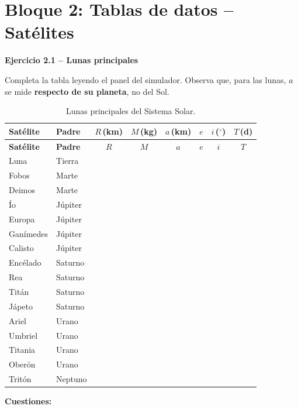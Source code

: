 \documentclass[11pt,a4paper]{article}
\newenvironment{cajaEjercicio}[1][]{\par\medskip\noindent\textbf{#1}\par\smallskip}{\par\medskip}
\theoremstyle{definition}
\begin{document}
\section{Bloque 2: Tablas de datos -- Satélites}

\begin{cajaEjercicio}[Ejercicio 2.1 -- Lunas principales]
Completa la tabla leyendo el panel del simulador. Observa que, para las lunas, $a$ se mide \textbf{respecto de su planeta}, no del Sol.

\begin{longtable}{@{}llcccccc@{}}
\caption{Lunas principales del Sistema Solar.} \\
\toprule
\textbf{Satélite} & \textbf{Padre} & $R$\,(\si{\kilo\metre}) & $M$\,(\si{\kilo\gram}) & $a$\,(\si{\kilo\metre}) & $e$ & $i$\,($^{\circ}$) & $T$\,(\si{\day}) \\
\midrule
\endfirsthead
\toprule
\textbf{Satélite} & \textbf{Padre} & $R$ & $M$ & $a$ & $e$ & $i$ & $T$ \\
\midrule
\endhead
Luna      & Tierra   & & & & & & \\
Fobos     & Marte    & & & & & & \\
Deimos    & Marte    & & & & & & \\
Ío        & Júpiter  & & & & & & \\
Europa    & Júpiter  & & & & & & \\
Ganímedes & Júpiter  & & & & & & \\
Calisto   & Júpiter  & & & & & & \\
Encélado  & Saturno  & & & & & & \\
Rea       & Saturno  & & & & & & \\
Titán     & Saturno  & & & & & & \\
Jápeto    & Saturno  & & & & & & \\
Ariel     & Urano    & & & & & & \\
Umbriel   & Urano    & & & & & & \\
Titania   & Urano    & & & & & & \\
Oberón    & Urano    & & & & & & \\
Tritón    & Neptuno  & & & & & & \\
\bottomrule
\end{longtable}
\end{cajaEjercicio}

\textbf{Cuestiones:}
\end{document}
